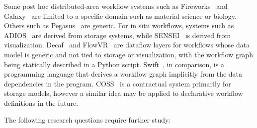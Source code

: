 \begin{refsection}
Some post hoc distributed-area workflow systems such as Fireworks~\cite{Jain15} and Galaxy~\cite{Afgan11} are limited to a specific domain such as material science or biology. Others such as Pegasus~\cite{Deelman15} are generic. For in situ workflows, systems such as ADIOS~\cite{Boyuka14} are derived from storage systems, while SENSEI~\cite{Ayachit16} is derived from visualization. Decaf~\cite{Dreher17} and FlowVR~\cite{Dreher14} are dataflow layers for workflows whose data model is generic and not tied to storage or visualization, with the workflow graph being statically described in a Python script. Swift~\cite{Wozniak13}, in comparison, is a programming language that derives a workflow graph implicitly from the data dependencies in the program. COSS~\cite{Dorier17} is a contractual system primarily for storage models, however a similar idea may be applied to declarative workflow definitions in the future.

The following research questions require further study:


\end{refsection}

